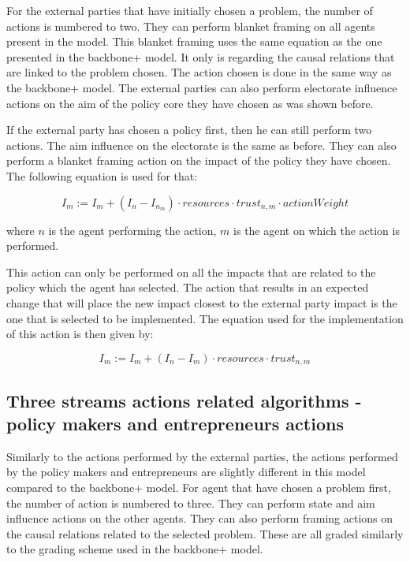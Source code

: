 For the external parties that have initially chosen a problem, the number of actions is numbered to two. They can perform blanket framing on all agents present in the model. This blanket framing uses the same equation as the one presented in the backbone+ model. It only is regarding the causal relations that are linked to the problem chosen. The action chosen is done in the same way as the backbone+ model. The external parties can also perform electorate influence actions on the aim of the policy core they have chosen as was shown before.

If the external party has chosen a policy first, then he can still perform two actions. The aim influence on the electorate is the same as before. They can also perform a blanket framing action on the impact of the policy they have chosen. The following equation is used for that:

\begin{equation}
I_{m} := I_{m} + \left(I_{n} - I_{n_m} \right) \cdot resources \cdot trust_{n,m} \cdot actionWeight
\end{equation}

where $n$ is the agent performing the action, $m$ is the agent on which the action is performed.

This action can only be performed on all the impacts that are related to the policy which the agent has selected. The action that results in an expected change that will place the new impact closest to the external party impact is the one that is selected to be implemented. The equation used for the implementation of this action is then given by:

\begin{equation}
I_{m} := I_{m} + \left(I_{n} - I_{m} \right) \cdot resources \cdot trust_{n,m}
\end{equation}


\subsection{Three streams actions related algorithms - policy makers and entrepreneurs actions}

Similarly to the actions performed by the external parties, the actions performed by the policy makers and entrepreneurs are slightly different in this model compared to the backbone+ model. For agent that have chosen a problem first, the number of action is numbered to three. They can perform state and aim influence actions on the other agents. They can also perform framing actions on the causal relations related to the selected problem. These are all graded similarly to the grading scheme used in the backbone+ model.

